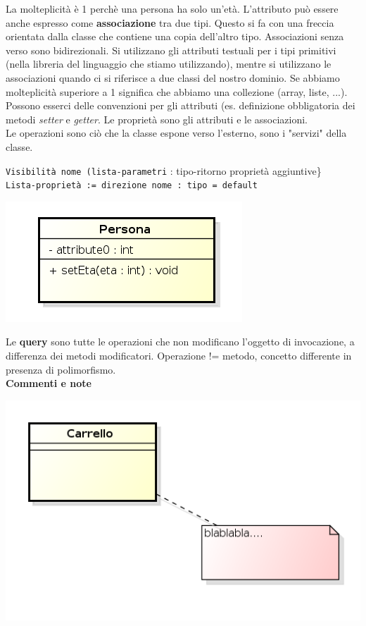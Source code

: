 La molteplicità è 1 perchè una persona ha solo un'età. L'attributo può essere anche espresso come \textbf{associazione} tra due tipi. Questo si fa con una freccia orientata dalla classe che contiene una copia dell'altro tipo. Associazioni senza verso sono bidirezionali. Si utilizzano gli attributi testuali per i tipi primitivi (nella libreria del linguaggio che stiamo utilizzando), mentre si utilizzano le associazioni quando ci si riferisce a due classi del nostro dominio. Se abbiamo molteplicità superiore a 1 significa che abbiamo una collezione (array, liste, ...). Possono esserci delle convenzioni per gli attributi (es. definizione obbligatoria dei metodi \textit{setter} e \textit{getter}. Le proprietà sono gli attributi e le associazioni.\\
Le operazioni sono ciò che la classe espone verso l'esterno, sono i "servizi" della classe.

\begin{center}

\texttt{Visibilità nome (lista-parametri} : tipo-ritorno {proprietà aggiuntive\}}\\
\texttt{Lista-proprietà := direzione nome : tipo = default}

\end{center}

\begin{center}

\includegraphics[width=0.75\columnwidth]{img8} %

\end{center}

Le \textbf{query} sono tutte le operazioni che non modificano l'oggetto di invocazione, a differenza dei metodi modificatori. Operazione != metodo, concetto differente in presenza di polimorfismo.\\\textbf{Commenti e note}

\begin{center}

\includegraphics[width=0.75\columnwidth]{img9} %

\end{center}


